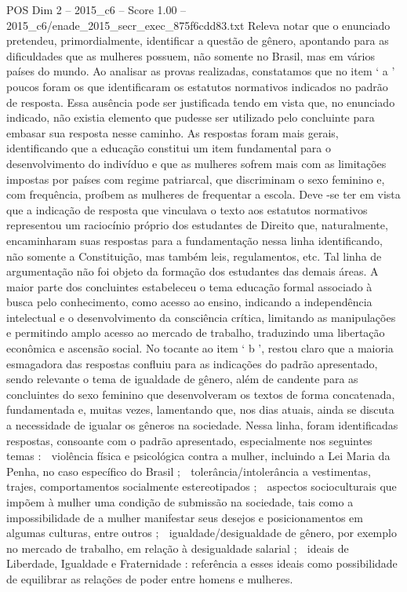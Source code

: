 \begin{textsample}{POS Dim 2 – 2015\_c6 – Score 1.00 – 2015\_c6/enade\_2015\_secr\_exec\_875f6cdd83.txt}
Releva notar que o enunciado pretendeu, primordialmente, identificar a questão de gênero, apontando para as dificuldades que as mulheres possuem, não somente no Brasil, mas em vários países do mundo.
Ao analisar as provas realizadas, constatamos que no item ‘ a ’ poucos foram os que identificaram os estatutos normativos indicados no padrão de resposta.
Essa ausência pode ser justificada tendo em vista que, no enunciado indicado, não existia elemento que pudesse ser utilizado pelo concluinte para embasar sua resposta nesse caminho.
As respostas foram mais gerais, identificando que a educação constitui um item fundamental para o desenvolvimento do indivíduo e que as mulheres sofrem mais com as limitações impostas por países com regime patriarcal, que discriminam o sexo feminino e, com frequência, proíbem as mulheres de frequentar a escola.
Deve -se ter em vista que a indicação de resposta que vinculava o texto aos estatutos normativos representou um raciocínio próprio dos estudantes de Direito que, naturalmente, encaminharam suas respostas para a fundamentação nessa linha identificando, não somente a Constituição, mas também leis, regulamentos, etc.
Tal linha de argumentação não foi objeto da formação dos estudantes das demais áreas.
A maior parte dos concluintes estabeleceu o tema educação formal associado à busca pelo conhecimento, como acesso ao ensino, indicando a independência intelectual e o desenvolvimento da consciência crítica, limitando as manipulações e permitindo amplo acesso ao mercado de trabalho, traduzindo uma libertação econômica e ascensão social.
No tocante ao item ‘ b ’, restou claro que a maioria esmagadora das respostas confluiu para as indicações do padrão apresentado, sendo relevante o tema de igualdade de gênero, além de candente para as concluintes do sexo feminino que desenvolveram os textos de forma concatenada, fundamentada e, muitas vezes, lamentando que, nos dias atuais, ainda se discuta a necessidade de igualar os gêneros na sociedade.
Nessa linha, foram identificadas respostas, consoante com o padrão apresentado, especialmente nos seguintes temas :  violência física e psicológica contra a mulher, incluindo a Lei Maria da Penha, no caso específico do Brasil ;  tolerância/intolerância a vestimentas, trajes, comportamentos socialmente estereotipados ;  aspectos socioculturais que impõem à mulher uma condição de submissão na sociedade, tais como a impossibilidade de a mulher manifestar seus desejos e posicionamentos em algumas culturas, entre outros ;  igualdade/desigualdade de gênero, por exemplo no mercado de trabalho, em relação à desigualdade salarial ;  ideais de Liberdade, Igualdade e Fraternidade : referência a esses ideais como possibilidade de equilibrar as relações de poder entre homens e mulheres.

\end{textsample}
